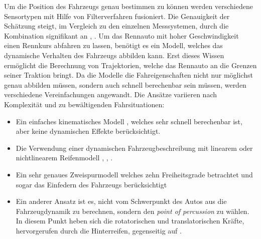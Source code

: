 \documentclass{like}
\begin{document}
Um die Position des Fahrzeugs genau bestimmen zu können werden verschiedene Sensortypen mit Hilfe von Filterverfahren fusioniert. Die Genauigkeit der Schätzung steigt, im Vergleich zu den einzelnen Messsystemen, durch die Kombination signifikant an \cite{GPS_Fusion}, \cite{GPS_IMU_Fusion}. 
Um das Rennauto mit hoher Geschwindigkeit einen Rennkurs abfahren zu lassen, benötigt es ein Modell, welches das dynamische Verhalten des Fahrzeugs abbilden kann. Erst dieses Wissen ermöglicht die Berechnung von Trajektorien, welche das Rennauto an die Grenzen seiner Traktion bringt. Da die Modelle die  Fahreigenschaften nicht nur möglichst genau abbilden müssen, sondern auch schnell berechenbar sein müssen, werden verschiedene Vereinfachungen angewandt. Die Ansätze variieren nach Komplexität und zu bewältigenden Fahrsituationen:
\begin{itemize}
	\item Ein einfaches kinematisches Modell \cite{MPC_Kinetic}, welches sehr schnell berechenbar ist, aber keine dynamischen Effekte berücksichtigt.
	\item Die Verwendung einer dynamischen Fahrzeugbeschreibung mit linearem oder nichtlinearem Reifenmodell \cite{rc_car_1_43}, \cite{MPC_Dynamic}, \cite{MPC_Dynamic_Tire_Model}.
	\item Ein sehr genaues Zweispurmodell welches zehn Freiheitsgrade betrachtet und sogar das Einfedern des Fahrzeugs berücksichtigt \cite{doi:10.1137/S0036144502414942} \\
	\item Ein anderer Ansatz ist es, nicht vom Schwerpunkt des Autos aus die Fahrzeugdynamik zu berechnen, sondern den \emph{point of percussion} zu wählen. In diesem Punkt heben sich die rotatorischen und translatorischen Kräfte, hervorgerufen durch die Hinterreifen, gegenseitig auf \cite{CentreOfPercussion}.
\end{itemize}
\end{document}
